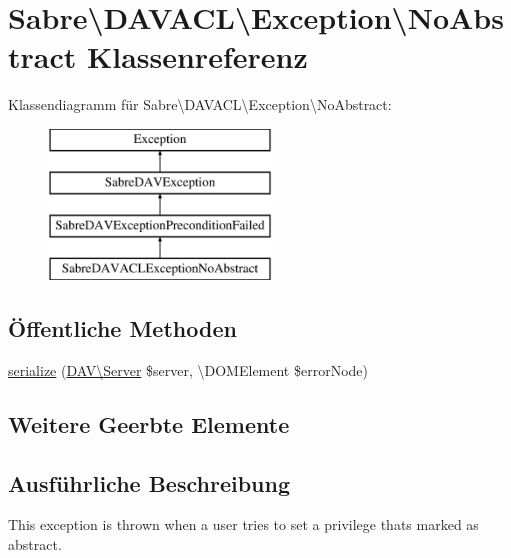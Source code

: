 \hypertarget{class_sabre_1_1_d_a_v_a_c_l_1_1_exception_1_1_no_abstract}{}\section{Sabre\textbackslash{}D\+A\+V\+A\+CL\textbackslash{}Exception\textbackslash{}No\+Abstract Klassenreferenz}
\label{class_sabre_1_1_d_a_v_a_c_l_1_1_exception_1_1_no_abstract}
Klassendiagramm für Sabre\textbackslash{}D\+A\+V\+A\+CL\textbackslash{}Exception\textbackslash{}No\+Abstract\+:\begin{figure}[H]
\begin{center}
\leavevmode
\includegraphics[height=4.000000cm]{class_sabre_1_1_d_a_v_a_c_l_1_1_exception_1_1_no_abstract}
\end{center}
\end{figure}
\subsection*{Öffentliche Methoden}
\begin{DoxyCompactItemize}
\item 
\mbox{\hyperlink{class_sabre_1_1_d_a_v_a_c_l_1_1_exception_1_1_no_abstract_ae7b8ca76b8cd3369dc0bd261ae1a06e4}{serialize}} (\mbox{\hyperlink{class_sabre_1_1_d_a_v_1_1_server}{D\+A\+V\textbackslash{}\+Server}} \$server, \textbackslash{}D\+O\+M\+Element \$error\+Node)
\end{DoxyCompactItemize}
\subsection*{Weitere Geerbte Elemente}


\subsection{Ausführliche Beschreibung}
This exception is thrown when a user tries to set a privilege that\textquotesingle{}s marked as abstract.


